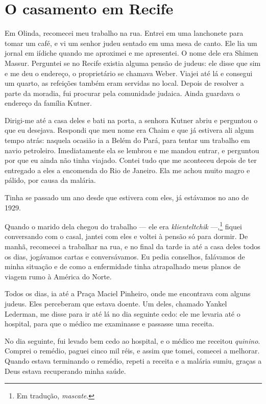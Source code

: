 \chapter{O casamento em Recife}

Em Olinda, recomecei meu trabalho na rua. Entrei em uma
lanchonete para tomar um café, e vi um senhor judeu sentado em uma mesa
de canto. Ele lia um jornal em iídiche quando me aproximei e me
apresentei. O nome dele era Shimen Massur. Perguntei se
no Recife existia alguma pensão de judeus: ele disse que sim e
me deu o endereço, o proprietário se chamava Weber. Viajei até lá e
consegui um quarto, as refeições também eram servidas no local.
Depois de resolver a parte da moradia, fui procurar pela comunidade judaica. Ainda
guardava o endereço da família Kutner.

Dirigi-me até a casa deles e bati na porta, a senhora Kutner abriu e
perguntou o que eu desejava. Respondi que meu nome era Chaim e que já estivera ali algum tempo
atrás: naquela ocasião ia a Belém do Pará, para tentar um trabalho em navio petroleiro. Imediatamente ela se
lembrou e me mandou entrar, e perguntou por que eu ainda não tinha viajado. 
Contei tudo que me aconteceu depois de ter entregado a eles a encomenda do Rio de Janeiro. Ela me achou muito magro e pálido, por causa da malária.

Tinha se passado um ano desde que estivera com eles, já estávamos no ano de
1929.

Quando o marido dela chegou do trabalho --- ele era \textit{klienteltchik} ---,\footnote{Em tradução, \textit{mascate}.} 
fiquei conversando com o casal, jantei com eles e
voltei à pensão só para dormir. De manhã, recomecei a trabalhar na rua, e
no final da tarde ia até a casa deles todos os dias, jogávamos cartas e
conversávamos. Eu pedia conselhos, falávamos de minha situação e de como
a enfermidade tinha atrapalhado meus planos de viagem rumo à América do Norte.

Todos os dias, ia até a Praça Maciel Pinheiro, onde me encontrava com
alguns judeus. Eles perceberam que estava doente. Um deles,
chamado Yankel Lederman, me disse para ir até lá no dia seguinte cedo: 
ele me levaria até o hospital, para que o médico me examinasse e passasse uma receita.

No dia seguinte, fui levado bem cedo ao hospital, e o médico me
receitou \textit{quinino}. Comprei o remédio, paguei cinco mil réis, e assim que
tomei, comecei a melhorar. Quando estava terminando o remédio,
repeti a receita e a malária sumiu, graças a Deus estava recuperando 
minha saúde.

